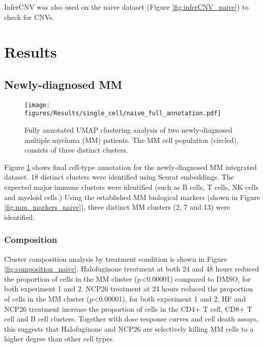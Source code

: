 InferCNV was also used on the naive dataset (Figure \ref{fig:inferCNV_naive}) to check for CNVs.

%


\clearpage
\section{Results}

\subsection{Newly-diagnosed MM}


\begin{figure}[hpt]
\centering
\texttt{[image: figures/Results/single\_cell/naive\_full\_annotation.pdf]}
\caption[Newly-diagnosed MM scRNA-seq full annotation]{Fully annotated UMAP clustering analysis of two newly-diagnosed multiple myeloma (MM) patients.
The MM cell population (circled), consists of three distinct clusters.}
\label{fig:full_anno_naive}
\end{figure}

Figure \ref{fig:full_anno_naive} shows final cell-type annotation for the newly-diagnosed MM integrated dataset.
18 distinct clusters were identified using Seurat embeddings.
The expected major immune clusters were identified (such as B cells, T cells, NK cells and myeloid cells.)
Using the established MM biological markers (shown in Figure \ref{fig:mm_markers_naive}), three distinct MM clusters (2, 7 and 13) were identified.

\subsubsection{Composition}
Cluster composition analysis by treatment condition is shown in Figure \ref{fig:composition_naive}.
Halofuginone treatment at both 24 and 48 hours reduced the proportion of cells in the MM cluster (p<0.00001) compared to DMSO, for both experiment 1 and 2.
NCP26 treatment at 24 hours reduced the proportion of cells in the MM cluster (p<0.00001), for both experiment 1 and 2.
HF and NCP26 treatment increase the proportion of cells in the CD4+ T cell, CD8+ T cell and B cell clusters.
Together with dose response curves and cell death assays, this suggests that Halofuginone and NCP26 are selectively killing MM cells to a higher degree than other cell types.


